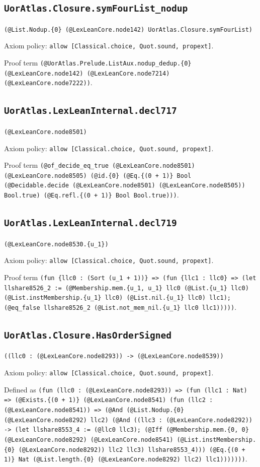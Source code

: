 \documentclass[11pt]{article}
\begin{document}
\subsection*{\texttt{UorAtlas.Closure.symFourList\_nodup}}
\noindent\texttt{(@List.Nodup.\{0\} (@LexLeanCore.node142) UorAtlas.Closure.symFourList)}\par
\noindent Axiom policy: \texttt{allow [Classical.choice, Quot.sound, propext]}.\par
\noindent Proof term \texttt{(@UorAtlas.Prelude.ListAux.nodup\_dedup.\{0\} (@LexLeanCore.node142) (@LexLeanCore.node7214) (@LexLeanCore.node7222))}.\par
\subsection*{\texttt{UorAtlas.LexLeanInternal.decl717}}
\noindent\texttt{(@LexLeanCore.node8501)}\par
\noindent Axiom policy: \texttt{allow [Classical.choice, Quot.sound, propext]}.\par
\noindent Proof term \texttt{(@of\_decide\_eq\_true (@LexLeanCore.node8501) (@LexLeanCore.node8505) (@id.\{0\} (@Eq.\{(0 + 1)\} Bool (@Decidable.decide (@LexLeanCore.node8501) (@LexLeanCore.node8505)) Bool.true) (@Eq.refl.\{(0 + 1)\} Bool Bool.true)))}.\par
\subsection*{\texttt{UorAtlas.LexLeanInternal.decl719}}
\noindent\texttt{(@LexLeanCore.node8530.\{u\_1\})}\par
\noindent Axiom policy: \texttt{allow [Classical.choice, Quot.sound, propext]}.\par
\noindent Proof term \texttt{(fun \{llc0 : (Sort (u\_1 + 1))\} => (fun \{llc1 : llc0\} => (let llshare8526\_2 := (@Membership.mem.\{u\_1, u\_1\} llc0 (@List.\{u\_1\} llc0) (@List.instMembership.\{u\_1\} llc0) (@List.nil.\{u\_1\} llc0) llc1); (@eq\_false llshare8526\_2 (@List.not\_mem\_nil.\{u\_1\} llc0 llc1)))))}.\par
\subsection*{\texttt{UorAtlas.Closure.HasOrderSigned}}
\noindent\texttt{((llc0 : (@LexLeanCore.node8293)) -> (@LexLeanCore.node8539))}\par
\noindent Axiom policy: \texttt{allow [Classical.choice, Quot.sound, propext]}.\par
\noindent Defined as \texttt{(fun (llc0 : (@LexLeanCore.node8293)) => (fun (llc1 : Nat) => (@Exists.\{(0 + 1)\} (@LexLeanCore.node8541) (fun (llc2 : (@LexLeanCore.node8541)) => (@And (@List.Nodup.\{0\} (@LexLeanCore.node8292) llc2) (@And ((llc3 : (@LexLeanCore.node8292)) -> (let llshare8553\_4 := (@llc0 llc3); (@Iff (@Membership.mem.\{0, 0\} (@LexLeanCore.node8292) (@LexLeanCore.node8541) (@List.instMembership.\{0\} (@LexLeanCore.node8292)) llc2 llc3) llshare8553\_4))) (@Eq.\{(0 + 1)\} Nat (@List.length.\{0\} (@LexLeanCore.node8292) llc2) llc1)))))))}.\par
\end{document}
